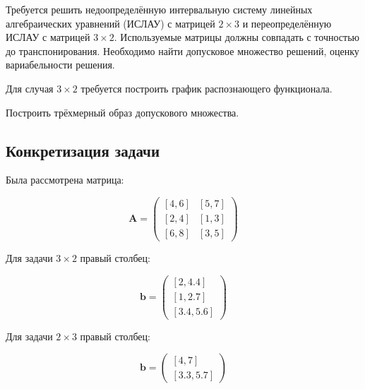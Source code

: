Требуется решить недоопределённую интервальную систему линейных алгебраических уравнений (ИСЛАУ) с матрицей $2 \times 3$ и переопределённую ИСЛАУ с матрицей $3 \times 2$. Используемые матрицы должны совпадать с точностью до транспонирования. Необходимо найти допусковое множество решений, оценку вариабельности решения.

Для случая $3 \times 2$ требуется построить график распознающего функционала.

Построить трёхмерный образ допускового множества.

\subsection{Конкретизация задачи}

Была рассмотрена матрица:

\begin{equation}
\mathbf{A}=
\begin{pmatrix}
[4, 6] & [5, 7] \\
[2, 4] & [1, 3] \\
[6, 8] & [3, 5]
\end{pmatrix}
\end{equation}

Для задачи $3 \times 2$ правый столбец:

\begin{equation}
\mathbf{b}=
\begin{pmatrix}
[2, 4.4] \\
[1, 2.7] \\
[3.4, 5.6]
\end{pmatrix}
\end{equation}

Для задачи $2 \times 3$ правый столбец:

\begin{equation}
\mathbf{b}=
\begin{pmatrix}
[4, 7] \\
[3.3, 5.7]
\end{pmatrix}
\end{equation}